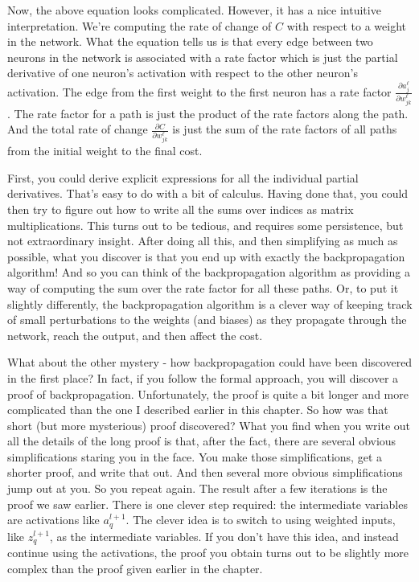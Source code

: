Now, the above equation looks complicated. However, it has a nice intuitive interpretation. We're computing the rate of change of $C$ with respect to a weight in the network. What the equation tells us is that every edge between two neurons in the network is associated with a rate factor which is just the partial derivative of one neuron's activation with respect to the other neuron's activation. The edge from the first weight to the first neuron has a rate factor $\frac{\partial a^\ell_j}{\partial w^\ell_{jk}}$. The rate factor for a path is just the product of the rate factors along the path. And the total rate of change $\frac{\partial C}{\partial w^\ell_{jk}}$ is just the sum of the rate factors of all paths from the initial weight to the final cost.

First, you could derive explicit expressions for all the individual partial derivatives. That's easy to do with a bit of calculus. Having done that, you could then try to figure out how to write all the sums over indices as matrix multiplications. This turns out to be tedious, and requires some persistence, but not extraordinary insight. After doing all this, and then simplifying as much as possible, what you discover is that you end up with exactly the backpropagation algorithm! And so you can think of the backpropagation algorithm as providing a way of computing the sum over the rate factor for all these paths. Or, to put it slightly differently, the backpropagation algorithm is a clever way of keeping track of small perturbations to the weights (and biases) as they propagate through the network, reach the output, and then affect the cost.

What about the other mystery - how backpropagation could have been discovered in the first place? In fact, if you follow the formal approach, you will discover a proof of backpropagation. Unfortunately, the proof is quite a bit longer and more complicated than the one I described earlier in this chapter. So how was that short (but more mysterious) proof discovered? What you find when you write out all the details of the long proof is that, after the fact, there are several obvious simplifications staring you in the face. You make those simplifications, get a shorter proof, and write that out. And then several more obvious simplifications jump out at you. So you repeat again. The result after a few iterations is the proof we saw earlier. There is one clever step required: the intermediate variables are activations like $a^{l+1}_q$. The clever idea is to switch to using weighted inputs, like $z^{l+1}_q$, as the intermediate variables. If you don't have this idea, and instead continue using the activations, the proof you obtain turns out to be slightly more complex than the proof given earlier in the chapter.

